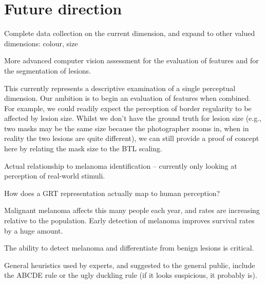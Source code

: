 \documentclass[a4paper, natbib, doc, 12pt]{apa7}
\begin{document}
\section{Future direction}
Complete data collection on the current dimension, and expand to other valued dimensions: colour, size

More advanced computer vision assessment for the evaluation of features and for the segmentation of lesions.

This currently represents a descriptive examination of a single perceptual dimension. Our ambition is to begin an evaluation of features when combined. For example, we could readily expect the perception of border regularity to be affected by lesion size. Whilst we don't have the ground truth for lesion size (e.g., two masks may be the same size because the photographer zooms in, when in reality the two lesions are quite different), we can still provide a proof of concept here by relating the mask size to the BTL scaling.

Actual relationship to melanoma identification -- currently only looking at perception of real-world stimuli.

How does a GRT representation actually map to human perception?


\newpage




































Malignant melanoma affects this many people each year, and rates are increasing relative to the population. Early detection of melanoma improves survival rates by a huge amount.

The ability to detect melanoma and differentiate from benign lesions is critical. 

General heuristics used by experts, and suggested to the general public, include the ABCDE rule or the ugly duckling rule (if it looks suspicious, it probably is). 
\end{document}
